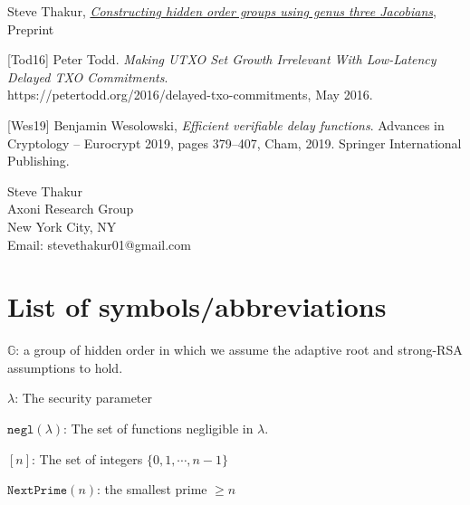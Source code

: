 \documentclass[11pt, lettersize, notitlepage, leqno, footskip=0.6cm]{article}
\newcommand{\ttt}{\texttt}
\newcommand{\negl}{\ttt{{negl}}}
\newcommand{\mb}{\mathbb}
\newcommand{\lam}{\lambda}
\newcommand{\noin}{\noindent}
\numberwithin{equation}{section}
\begin{document}
{{{%

\noindent [Th20] Steve Thakur, \href{https://eprint.iacr.org/2020/348}{\textit{Constructing hidden order groups using genus three Jacobians}}, Preprint \vspace{0.1cm} 

\noin \hypertarget{Tod16}{[Tod16]} Peter Todd. \textit{Making UTXO Set Growth Irrelevant With Low-Latency Delayed TXO Commitments}.\\ https://petertodd.org/2016/delayed-txo-commitments, May 2016.\vspace{0.1cm}

\noindent \hypertarget{Wes18}{[Wes19]} Benjamin Wesolowski, \textit{Efficient verifiable delay functions}. Advances in Cryptology – Eurocrypt 2019, pages 379–407, Cham, 2019. Springer International Publishing.\vspace{0.1cm}




\bigskip

\normalsize

\noindent Steve Thakur\\
Axoni Research Group\\
New York City, NY\\
Email: stevethakur01@gmail.com 


\newpage

\appendix

\section{\fontsize{11}{11}\selectfont List of symbols/abbreviations  }

\noindent $\mb{G}$: a group of hidden order in which we assume the adaptive root and strong-RSA assumptions to hold. \vspace{0.1cm}

\noindent $\lam$: The security parameter \vspace{0.1cm}

\noindent $\negl(\lam)$: The set of functions negligible in $\lam$. \vspace{0.1cm}

\noindent $[n]$: The set of integers $\{0,1,\cdots,n-1 \}$ \vspace{0.1cm}

\noin $\ttt{NextPrime}(n)$: the smallest prime $\geq n$ \vspace{0.1cm}

}}}
\end{document}
